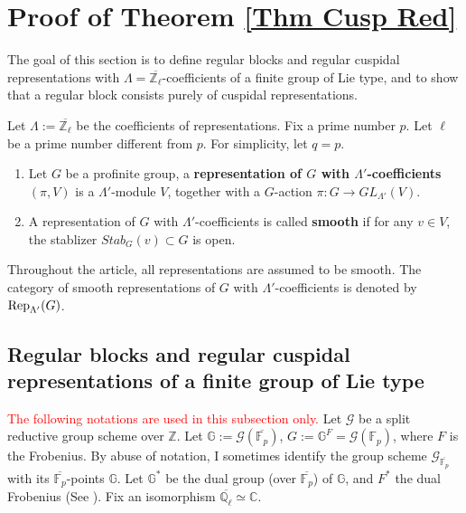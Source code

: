 	
	
	
	\section{Proof of Theorem \ref{Thm Cusp Red}}\label{Sec Reg Cusp}
	
	The goal of this section is to define regular blocks and regular cuspidal representations with $\Lambda=\overline{\mathbb{Z}_{\ell}}$-coefficients of a finite group of Lie type, and to show that a regular block consists purely of cuspidal representations.
	
	Let $\Lambda:=\overline{\mathbb{Z}_{\ell}}$ be the coefficients of representations. Fix a prime number $p$. Let $\ell$ be a prime number different from $p$. For simplicity, let $q=p$.
	
	\begin{definition}
		\begin{enumerate}Let $\Lambda'$ be any ring.
			\item Let $G$ be a profinite group, a \textbf{representation of $G$ with $\Lambda'$-coefficients} $(\pi, V)$ is a $\Lambda'$-module $V$, together with a $G$-action $\pi: G \to GL_{\Lambda'}(V)$.
			\item A representation of $G$ with $\Lambda'$-coefficients is called \textbf{smooth} if for any $v \in V$, the stablizer $Stab_G(v) \subset G$ is open.
		\end{enumerate}
	\end{definition}
	
	Throughout the article, all representations are assumed to be smooth. The category of smooth representations of $G$ with $\Lambda'$-coefficients is denoted by $\operatorname{\operatorname{Rep}}_{\Lambda'}(G)$.
	
	\subsection{Regular blocks and regular cuspidal representations of a finite group of Lie type}
	
	\textcolor{red}{The following notations are used in this subsection only.} Let $\mathcal{G}$ be a split reductive group scheme over $\mathbb{Z}$. Let $\mathbb{G}:=\mathcal{G}(\overline{\mathbb{F}_p})$, $G:=\mathbb{G}^F=\mathcal{G}(\mathbb{F}_p)$, where $F$ is the Frobenius. By abuse of notation, I sometimes identify the group scheme $\mathcal{G}_{\overline{\mathbb{F}_p}}$ with its $\overline{\mathbb{F}_p}$-points $\mathbb{G}$. Let $\mathbb{G}^*$ be the dual group (over $\overline{\mathbb{F}_p}$) of $\mathbb{G}$, and $F^*$ the dual Frobenius (See \cite[Section 4.2]{carter1985finite}). Fix an isomorphism $\overline{\mathbb{Q}_{\ell}} \simeq \mathbb{C}$. 
	
